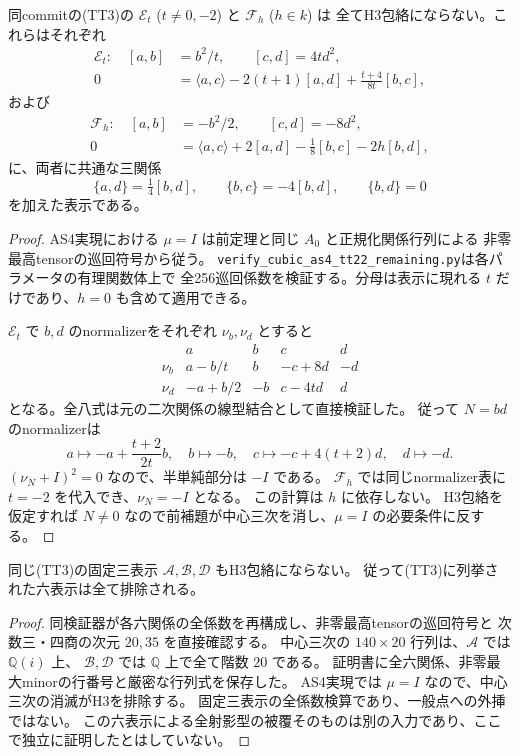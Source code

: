 \begin{theorem}[残る二つの一パラメータ表示の全排除]
\label{thm:tt22-EF-all-excluded}
同commitの(TT3)の $\mathcal E_t$ ($t\ne0,-2$) と $\mathcal F_h$ ($h\in k$) は
全てH3包絡にならない。これらはそれぞれ
\[
\begin{split}
 \mathcal E_t:\quad [a,b]&=b^2/t,\qquad[c,d]=4t d^2,\\
 0&=\langle a,c\rangle-2(t+1)[a,d]+\frac{t+4}{8t}[b,c],
\end{split}
\]
および
\[
\begin{split}
 \mathcal F_h:\quad [a,b]&=-b^2/2,\qquad[c,d]=-8d^2,\\
 0&=\langle a,c\rangle+2[a,d]-\tfrac18[b,c]-2h[b,d],
\end{split}
\]
に、両者に共通な三関係
\[
 \{a,d\}=\tfrac14[b,d],\qquad
 \{b,c\}=-4[b,d],\qquad \{b,d\}=0
\]
を加えた表示である。
\end{theorem}
\begin{proof}
AS4実現における $\mu=I$ は前定理と同じ $A_0$ と正規化関係行列による
非零最高tensorの巡回符号から従う。
\texttt{verify\_cubic\_as4\_tt22\_remaining.py}は各パラメータの有理関数体上で
全256巡回係数を検証する。分母は表示に現れる $t$ だけであり、$h=0$ も含めて適用できる。

$\mathcal E_t$ で $b,d$ のnormalizerをそれぞれ $\nu_b,\nu_d$ とすると
\[
\begin{array}{c|rrrr}
 &a&b&c&d\\\hline
\nu_b&a-b/t&b&-c+8d&-d\\
\nu_d&-a+b/2&-b&c-4td&d
\end{array}
\]
となる。全八式は元の二次関係の線型結合として直接検証した。
従って $N=bd$ のnormalizerは
\[
 a\longmapsto-a+\frac{t+2}{2t}b,\quad b\longmapsto-b,\quad
 c\longmapsto-c+4(t+2)d,\quad d\longmapsto-d.
\]
$(\nu_N+I)^2=0$ なので、半単純部分は $-I$ である。
$\mathcal F_h$ では同じnormalizer表に $t=-2$ を代入でき、$\nu_N=-I$ となる。
この計算は $h$ に依存しない。
H3包絡を仮定すれば $N\ne0$ なので前補題が中心三次を消し、$\mu=I$ の必要条件に反する。
\end{proof}

\begin{proposition}[三つの固定表示の排除]
\label{prop:tt22-fixed-all-excluded}
同じ(TT3)の固定三表示 $\mathcal A,\mathcal B,\mathcal D$ もH3包絡にならない。
従って(TT3)に列挙された六表示は全て排除される。
\end{proposition}
\begin{proof}
同検証器が各六関係の全係数を再構成し、非零最高tensorの巡回符号と
次数三・四商の次元 $20,35$ を直接確認する。
中心三次の $140\times20$ 行列は、$\mathcal A$ では $\mathbb Q(i)$ 上、
$\mathcal B,\mathcal D$ では $\mathbb Q$ 上で全て階数 $20$ である。
証明書に全六関係、非零最大minorの行番号と厳密な行列式を保存した。
AS4実現では $\mu=I$ なので、中心三次の消滅がH3を排除する。
固定三表示の全係数検算であり、一般点への外挿ではない。
この六表示による全射影型の被覆そのものは別の入力であり、ここで独立に証明したとはしていない。
\end{proof}
